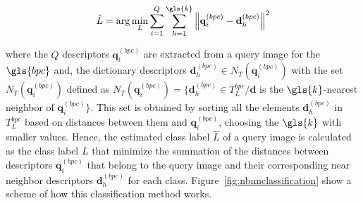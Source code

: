 \begin{equation}
\hat{L} = \arg \min_{L} \sum_{i=1}^{Q} \sum_{h=1}^{\gls{k}} {\left\lVert \mathbf{q}_{i}^{(bpc)} -  \mathbf{d}_{h}^{(bpc)} \right\rVert}  ^{2} 
\label{eq:classification}
\end{equation}

\noindent where the $Q$ descriptors $ \mathbf{q}_{i}^{(bpc)} $ are extracted from a query image for the $\gls{bpc}$ and, the dictionary descriptors  $\mathbf{d}_{h}^{(bpc)} \in N_T(  \mathbf{q}_{i}^{(bpc)} )$ with the set $N_T(  \mathbf{q}_{i}^{(bpc)} ) $ defined as $N_T(  \mathbf{q}_{i}^{(bpc)} ) = \{ \mathbf{d}_{h}^{(bpc)} \in T_{L}^{bpc} / \mathbf{d} $ is the $\gls{k}$-nearest neighbor of $  \mathbf{q}_{i}^{(bpc)} \}$.  This set is obtained by sorting all the elements $ \mathbf{d}_{h}^{(bpc)} $ in $T_{L}^{bpc}$ based on distances between them and $\mathbf{q}_{i}^{(bpc)}$, choosing the $\gls{k}$ with smaller values.  Hence, the estimated class label $\hat{L}$ of a query image is calculated as the class label $L$ that minimize the summation of the distances between descriptors $\mathbf{q}_{i}^{(bpc)}$ that belong to the query image and their corresponding near neighbor descriptors $\mathbf{d}_{h}^{(bpc)} $  for each class. Figure~\ref{fig:nbnnclassification} show a scheme of how this classification method works.

